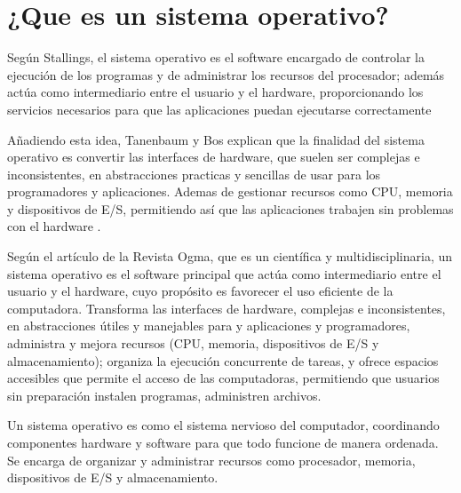 \section{¿Que es un sistema operativo?}
Según Stallings, el sistema operativo es el software encargado de controlar 
la ejecución de los programas y de administrar los recursos del procesador; 
además actúa como intermediario entre el usuario y el hardware, proporcionando
los servicios necesarios para que las aplicaciones puedan ejecutarse correctamente \citep{Stallings2023} 

Añadiendo esta idea, Tanenbaum y Bos explican que la finalidad del sistema 
operativo es convertir las interfaces de hardware, que suelen ser complejas e 
inconsistentes, en abstracciones practicas y sencillas de usar para los programadores
y aplicaciones. Ademas de gestionar recursos como CPU, memoria y dispositivos de E/S, permitiendo así
que las aplicaciones trabajen sin problemas con el hardware \citep{Tanenbaum2023}.

Según el artículo de la Revista Ogma, que es un científica y multidisciplinaria, un 
sistema operativo es el software principal que actúa como intermediario 
entre el usuario y el hardware, cuyo propósito es favorecer el uso eficiente 
de la computadora. Transforma las interfaces de hardware, complejas e inconsistentes, en abstracciones útiles y manejables para 
y aplicaciones y programadores, administra y mejora recursos (CPU, memoria, 
dispositivos de E/S y almacenamiento); organiza la ejecución concurrente de 
tareas, y ofrece espacios accesibles que permite el acceso de las 
computadoras, permitiendo que usuarios sin preparación instalen 
programas, administren archivos. \citep{CusmeVera2022}

Un sistema operativo es como el sistema nervioso del computador, coordinando 
componentes hardware y software para que todo funcione de manera ordenada. Se 
encarga de organizar y administrar recursos como procesador, memoria, 
dispositivos de E/S y almacenamiento.
